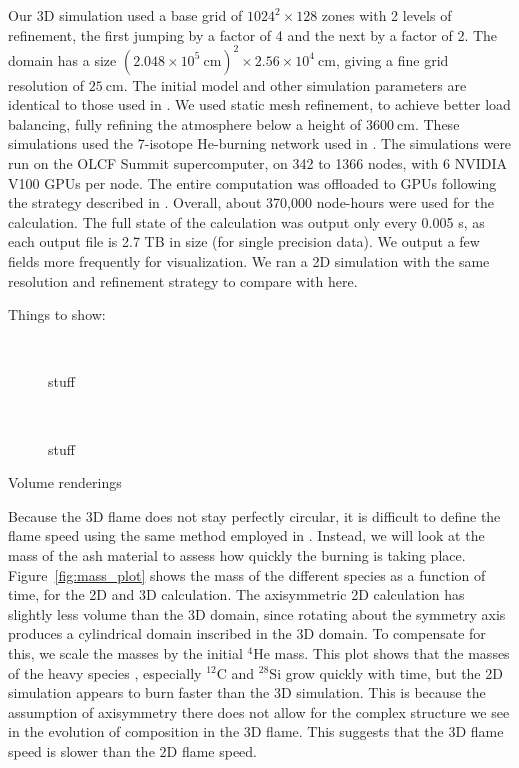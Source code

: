 \documentclass[preprint,times,tighten]{aastex631}
\newcommand{\isot}[2]{$^{#2}\mathrm{#1}$}
\begin{document}
Our 3D simulation used a base grid of $1024^2 \times 128$ zones with 2
levels of refinement, the first jumping by a factor of 4 and the next
by a factor of 2.  The domain has a size $(2.048\times
10^5~\mathrm{cm})^2 \times 2.56\times 10^4~\mathrm{cm}$, giving a fine
grid resolution of $25~\mathrm{cm}$.  The initial model and other
simulation parameters are identical to those used in
\citet{harpole:2021}.  We used static mesh refinement, to achieve
better load balancing, fully refining the atmosphere below a height of
$3600~\mathrm{cm}$.  These simulations used the 7-isotope He-burning
network used in \citet{eiden:2020}.  The simulations were run on the
OLCF Summit supercomputer, on 342 to 1366 nodes, with 6 NVIDIA V100
GPUs per node.  The entire computation was offloaded to GPUs following
the strategy described in \citet{castro_gpu}.  Overall, about 370,000
node-hours were used for the calculation.  The full state of the
calculation was output only every 0.005 s, as each output file is 2.7 TB
in size (for single precision data).  We output a few fields more
frequently for visualization.  We ran a 2D simulation with the same
resolution and refinement strategy to compare with here.

Things to show:

\begin{figure}[t]
\centering
{} \\
\caption{\label{fig:vr_abar} stuff}
\end{figure}

\begin{figure}[t]
\centering
{} \\
\caption{\label{fig:vr_hnuc} stuff}
\end{figure}

Volume renderings

Because the 3D flame does not stay perfectly circular, it is difficult
to define the flame speed using the same method employed in
\citet{eiden:2020}.  Instead, we will look at the mass of the ash
material to assess how quickly the burning is taking place.
Figure~\ref{fig:mass_plot} shows the mass of the different species as
a function of time, for the 2D and 3D calculation.  The axisymmetric
2D calculation has slightly less volume than the 3D domain, since
rotating about the symmetry axis produces a cylindrical domain
inscribed in the 3D domain.  To compensate for this, we scale the
masses by the initial \isot{He}{4} mass.  This plot shows that the
masses of the heavy species , especially \isot{C}{12} and
\isot{Si}{28} grow quickly with time, but the 2D simulation appears to
burn faster than the 3D simulation.  This is because the assumption of
axisymmetry there does not allow for the complex structure we see in
the evolution of composition in the 3D flame.  This suggests that the
3D flame speed is slower than the 2D flame speed.
\end{document}
